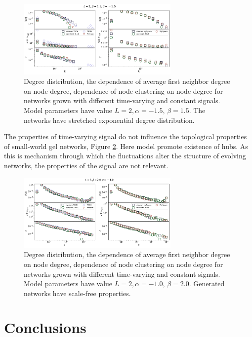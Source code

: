 \begin{figure}[h!]
	\centering
	\includegraphics[width=0.7\textwidth]{Figures/b3.pdf}
	\caption{Degree distribution, the dependence of average first neighbor degree on node degree, dependence of node clustering on node degree for networks grown with different time-varying and constant signals. Model parameters have value $L=2, \alpha=-1.5$, $\beta=1.5$. The networks have stretched exponential degree distribution.}
	\label{fig:properties_se}
\end{figure}

The properties of time-varying signal do not influence the topological properties of small-world gel networks, Figure \ref{fig:properties_sw}. Here model promote existence of hubs. As this is mechanism through which the fluctuations alter the structure of evolving networks, the properties of the signal are not relevant.  


\begin{figure}[h!]
	\centering
	\includegraphics[width=0.7\textwidth]{Figures/b2.pdf}
	\caption{Degree distribution, the dependence of average first neighbor degree on node degree, dependence of node clustering on node degree for networks grown with different time-varying and constant signals. Model parameters have value $ L=2, \alpha=-1.0$, $\beta=2.0$. Generated networks have scale-free properties.}
	\label{fig:properties_sw}
\end{figure}

\newpage
\section{Conclusions}

